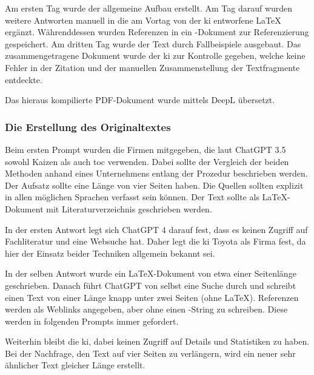 Am ersten Tag wurde der allgemeine Aufbau erstellt. Am Tag darauf wurden weitere Antworten manuell in die am Vortag von der \gls{ki} entworfene \LaTeX{} ergänzt. Währenddessen wurden Referenzen in ein \BibTeX{}-Dokument zur Referenzierung gespeichert. Am dritten Tag wurde der Text durch Fallbeispiele ausgebaut. Das zusammengetragene Dokument wurde der \gls{ki} zur Kontrolle gegeben, welche keine Fehler in der Zitation und der manuellen Zusammenstellung der Textfragmente entdeckte. 

Das hieraus kompilierte PDF-Dokument wurde mittels DeepL übersetzt. 


\subsubsection{Die Erstellung des Originaltextes}

Beim ersten Prompt wurden die Firmen mitgegeben, die laut ChatGPT 3.5 sowohl Kaizen als auch \gls{toc} verwenden. Dabei sollte der Vergleich der beiden Methoden anhand eines Unternehmens entlang der Prozedur beschrieben werden. Der Aufsatz sollte eine Länge von vier Seiten haben. Die Quellen sollten explizit in allen möglichen Sprachen verfasst sein können. Der Text sollte als \LaTeX-Dokument mit Literaturverzeichnis geschrieben werden.

In der ersten Antwort legt sich ChatGPT 4 darauf fest, dass es keinen Zugriff auf Fachliteratur und eine Websuche hat. Daher legt die \gls{ki} Toyota als Firma fest, da hier der Einsatz beider Techniken allgemein bekannt sei.

In der selben Antwort wurde ein \LaTeX{}-Dokument von etwa einer Seitenlänge geschrieben.
Danach führt ChatGPT von selbst eine Suche durch und schreibt einen Text von einer Länge knapp unter zwei Seiten (ohne \LaTeX{}). Referenzen werden als Weblinks angegeben, aber ohne einen \BibTeX{}-String zu schreiben. Diese werden in folgenden Prompts immer gefordert.

Weiterhin bleibt die \gls{ki}, dabei keinen Zugriff auf Details und Statistiken zu haben. Bei der Nachfrage, den Text auf vier Seiten zu verlängern, wird ein neuer sehr ähnlicher Text gleicher Länge erstellt.

